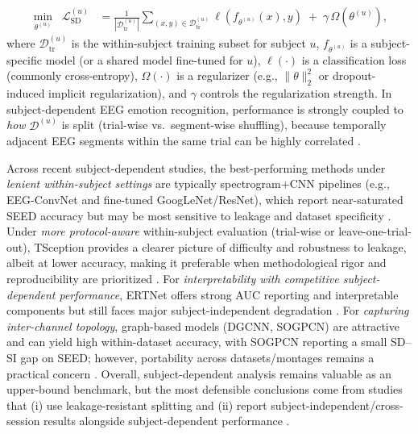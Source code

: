\documentclass{WileyMSP-template}
\begin{document}
\begin{align}
\min_{\theta^{(u)}}\;\; \mathcal{L}_{\mathrm{SD}}^{(u)}
&=\frac{1}{|\mathcal{D}^{(u)}_{\mathrm{tr}}|}\sum_{(x,y)\in \mathcal{D}^{(u)}_{\mathrm{tr}}}\ell\!\left(f_{\theta^{(u)}}(x),y\right)
\;+\;\gamma\,\Omega\!\left(\theta^{(u)}\right),
\label{eq:subject_dependent_objective}
\end{align}
where $\mathcal{D}^{(u)}_{\mathrm{tr}}$ is the within-subject training subset for subject $u$, $f_{\theta^{(u)}}$ is a subject-specific model (or a shared model fine-tuned for $u$), $\ell(\cdot)$ is a classification loss (commonly cross-entropy), $\Omega(\cdot)$ is a regularizer (e.g., $\|\theta\|_2^2$ or dropout-induced implicit regularization), and $\gamma$ controls the regularization strength. In subject-dependent EEG emotion recognition, performance is strongly coupled to \emph{how} $\mathcal{D}^{(u)}$ is split (trial-wise vs.\ segment-wise shuffling), because temporally adjacent EEG segments within the same trial can be highly correlated \cite{ding2022tsception}.

Across recent subject-dependent studies, the best-performing methods under \emph{lenient within-subject settings} are typically spectrogram+CNN pipelines (e.g., EEG-ConvNet and fine-tuned GoogLeNet/ResNet), which report near-saturated SEED accuracy but may be most sensitive to leakage and dataset specificity \cite{khan2024eegconvnet}. Under \emph{more protocol-aware} within-subject evaluation (trial-wise or leave-one-trial-out), TSception provides a clearer picture of difficulty and robustness to leakage, albeit at lower accuracy, making it preferable when methodological rigor and reproducibility are prioritized \cite{ding2022tsception}. For \emph{interpretability with competitive subject-dependent performance}, ERTNet offers strong AUC reporting and interpretable components but still faces major subject-independent degradation \cite{liu2024ertnet}. For \emph{capturing inter-channel topology}, graph-based models (DGCNN, SOGPCN) are attractive and can yield high within-dataset accuracy, with SOGPCN reporting a small SD--SI gap on SEED; however, portability across datasets/montages remains a practical concern \cite{song2020dgcnn,zhu2024sogpcn}. Overall, subject-dependent analysis remains valuable as an upper-bound benchmark, but the most defensible conclusions come from studies that (i) use leakage-resistant splitting and (ii) report subject-independent/cross-session results alongside subject-dependent performance \cite{apicella2024neucom_systematic,wang2024csur_researchprogress}.
\end{document}
